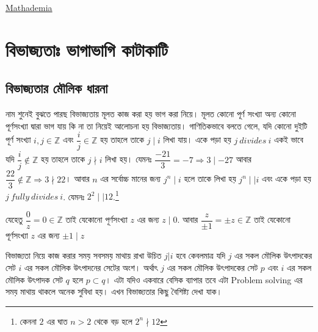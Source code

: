\documentclass[a4paper,11pt]{article}
\begin{document}
\begin{titlepage}
	
	
	\Large \href{https://www.youtube.com/channel/UCi_c260M8xmL-RfpT5yp1OA?}{Mathademia}
	
	
	\vfill %
	
\end{titlepage}

\tableofcontents
\thispagestyle{empty}
\newpage
\addtocounter{page}{-1}

\section{বিভাজ্যতাঃ ভাগাভাগি কাটাকাটি}

\subsection{বিভাজ্যতার মৌলিক ধারনা}
নাম শুনেই বুঝতে পারছ বিভাজ্যতায় মূলত কাজ করা হয় ভাগ করা নিয়ে। মূলত কোনো পূর্ণ সংখ্যা অন্য কোনো পূর্ণসংখ্যা দ্বারা ভাগ যায় কি না তা নিয়েই আলোচনা হয় বিভাজ্যতায়। গাণিতিকভাবে বলতে গেলে, যদি কোনো দুইটি পূর্ণ সংখ্যা $i,j \in \mathbb{Z}$ এবং $\dfrac{i}{j} \in \mathbb{Z}$ হয় তাহলে তাকে $j \mid i$ লিখা যায়। একে পড়া হয় \textit{$j \ divides \ i$} একই ভাবে যদি $\dfrac{i}{j} \notin \mathbb{Z}$ হয় তাহলে তাকে $j \nmid i$ লিখা হয়। যেমনঃ $\dfrac{-21}{3}=-7 \Longrightarrow 3 \mid -27$ আবার $\dfrac{22}{3} \notin \mathbb{Z} \Longrightarrow 3 \nmid 22$। আবার $n$ এর সর্বোচ্চ মানের জন্য $j^n \mid i$ হলে তাকে লিখা হয় $j^n \mid \mid i$ এবং একে পড়া হয় $j \ fully \ divides \ i$. যেমনঃ $2^2 \mid \mid 12$.\footnote{কেননা $2$ এর ঘাত $n>2$ থেকে বড় হলে $2^n \nmid 12$}

যেহেতু $\dfrac{0}{z}=0 \in \mathbb{Z}$ তাই যেকোনো পূর্ণসংখ্যা $z$ এর জন্য $z \mid 0$. আবার $\dfrac{z}{\pm 1}=\pm z \in \mathbb{Z}$ তাই যেকোনো পূর্ণসংখ্যা $z$ এর জন্য $\pm 1 \mid z$

বিভাজ্যতা নিয়ে কাজ করার সময় সবসময় মাথায় রাখা উচিত $j|i$ হবে কেবলমাত্র যদি $j$ এর সকল মৌলিক উৎপাদকের সেট $i$ এর সকল মৌলিক উৎপাদনের সেটের অংশ। অর্থাৎ $j$ এর সকল মৌলিক উৎপাদকের সেট $p$ এবং $i$ এর সকল মৌলিক উৎপাদক সেট $q$ হলে $p \subset q$। এটা যদিও একবারে বেসিক ব্যাপার তবে এটা Problem solving এর সময় মাথায় থাকলে অনেক সুবিধা হয়। এখন বিভাজ্যতার কিছু বৈশিষ্ট্য দেখা যাক। 
\end{document}

